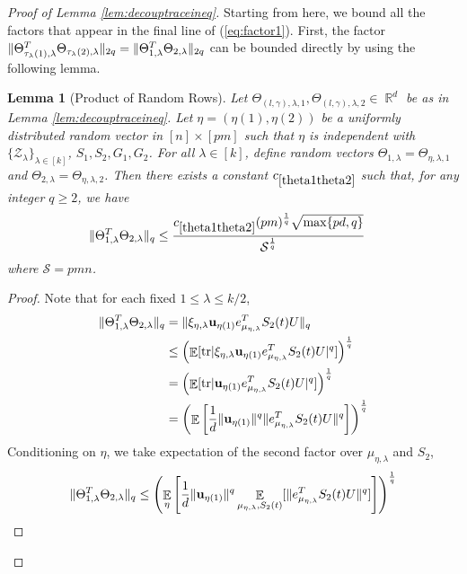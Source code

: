 \documentclass[11pt]{amsart}
\numberwithin{equation}{section}
\numberwithin{equation}{section}
\DeclareMathOperator{\E}{\mathbb{E}}
\DeclareMathOperator{\R}{\mathbb{R}}
\DeclareMathOperator*{\tr}{tr}
\newcommand{\cS}{\mathcal{S}}
\DeclarePairedDelimiter{\norm}{\lVert}{\rVert}
\DeclarePairedDelimiter{\abs}{\lvert}{\rvert}
\newtheorem{lemma}[theorem]{Lemma}
\theoremstyle{remark}
\theoremstyle{definition}
\begin{document}
\begin{proof}[Proof of Lemma \ref{lem:decouptraceineq}]
Starting from here, we bound all the factors that appear in the final line of (\ref{eq:factor1}). First, the factor $\norm{\Theta_{\tau_{\lambda}(1),\lambda}^T\Theta_{\tau_{\lambda}(2),\lambda}}_{2q}=\norm{\Theta_{1,\lambda}^T\Theta_{2,\lambda}}_{2q}$ can be bounded directly by using the following lemma.

\begin{lemma}[Product of Random Rows] \label{theta1theta2}
Let $\Theta_{(l,\gamma), \lambda, 1}, \Theta_{(l,\gamma), \lambda, 2} \in \R^d$ be as in Lemma \ref{lem:decouptraceineq}. Let $\eta = (\eta(1), \eta(2))$ be a uniformly distributed random vector in $[n] \times [pm]$ such that $\eta$ is independent with $\{\mathcal{Z}_{\lambda}\}_{\lambda \in [k]}$, $S_1, S_2, G_1, G_2$. For all $\lambda \in [k]$, define random vectors $\Theta_{1, \lambda} = \Theta_{\eta, \lambda, 1}$ and $\Theta_{2, \lambda} = \Theta_{\eta, \lambda, 2}$. Then there exists a constant $c_{\ref*{theta1theta2}}$ such that, for any integer $q \ge 2$, we have
\begin{align*}
\norm{\Theta_{1,\lambda}^T\Theta_{2,\lambda}}_{q} &\le \frac{c_{\ref*{theta1theta2}}(pm)^{\frac{1}{q}}\sqrt{\max \{ pd, q \}}}{\cS^\frac{1}{q}}
\end{align*}
where $\cS=pmn$.
\end{lemma}

\begin{proof}
Note that for each fixed $1 \le \lambda \le k/2$, 
\begin{align*}
    \norm{\Theta_{1,\lambda}^T\Theta_{2,\lambda}}_{q} &= \norm{\xi_{\eta, \lambda} \mathbf{u}_{\eta(1)} e_{\mu_{\eta,\lambda}}^TS_2(t)U}_{q} \\
    &\le \left( \E [\tr \abs{\xi_{\eta, \lambda} \mathbf{u}_{\eta(1)} e_{\mu_{\eta,\lambda}}^TS_2(t)U}^{q} ] \right)^\frac{1}{q} \\
    &= \left( \E [\tr \abs{ \mathbf{u}_{\eta(1)} e_{\mu_{\eta,\lambda}}^TS_2(t)U}^{q} ] \right)^\frac{1}{q} \\
    &= \left( \E \left[ \frac{1}{d} \norm{ \mathbf{u}_{\eta(1)} }^{q}\norm{e_{\mu_{\eta,\lambda}}^TS_2(t)U}^{q} \right] \right)^\frac{1}{q} \\
\end{align*} 
Conditioning on $\eta$, we take expectation of the second factor over $\mu_{\eta, \lambda}$ and $S_2$,
\begin{align*}
    \norm{\Theta_{1,\lambda}^T\Theta_{2,\lambda}}_{q} &\le \left( \E_{\eta} \left[ \frac{1}{d} \norm{ \mathbf{u}_{\eta(1)} }^{q} \E_{\mu_{\eta, \lambda}, S_2(t)}[ \norm{e_{\mu_{\eta,\lambda}}^TS_2(t)U}^{q}] \right] \right)^\frac{1}{q} \\
\end{align*}


\end{proof}
\end{proof}
\end{document}

